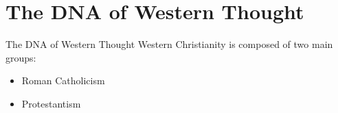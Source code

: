 \section{The DNA of Western Thought}
\begin{frame}{The DNA of Western Thought}{}
	Western Christianity is composed of two main groups:
	\begin{itemize}
		\item Roman Catholicism
		\item Protestantism
	\end{itemize}
\end{frame}
